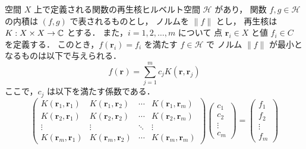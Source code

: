 \begin{theorem}\label{theorem:interp_kernel_rkhs_exact-interp}
    空間 $X$ 上で定義される関数の再生核ヒルベルト空間 $\mathcal{H}$ があり，
    関数 $f, g \in \mathcal{H}$ の内積は $(f, g)$ で表されるものとし，
    ノルムを $\|f\|$ とし，
    再生核は $K : X \times X \to \mathbb{C}$ とする．
    また，$i = 1, 2, \ldots, m$ について
    点 $\bm{r}_i \in X$ と値 $f_i \in C$ を定義する．
    このとき，$f(\bm{r}_i) = f_i$ を満たす $f \in \mathcal{H}$ で
    ノルム $\|f\|$ が最小となるものは以下で与えられる．
    \begin{equation}
        f(\bm{r}) = \sum_{j = 1}^{m} c_j K(\bm{r}, \bm{r}_j)
    \end{equation}
    ここで，$c_j$ は以下を満たす係数である．
    \begin{equation}
        \begin{pmatrix}
            K(\bm{r}_1, \bm{r}_1) & K(\bm{r}_1, \bm{r}_2) & \cdots & K(\bm{r}_1, \bm{r}_m) \\
            K(\bm{r}_2, \bm{r}_1) & K(\bm{r}_2, \bm{r}_2) & \cdots & K(\bm{r}_2, \bm{r}_m) \\
            \vdots                & \vdots                & \ddots & \vdots                \\
            K(\bm{r}_m, \bm{r}_1) & K(\bm{r}_m, \bm{r}_2) & \cdots & K(\bm{r}_m, \bm{r}_m)
        \end{pmatrix}
        \begin{pmatrix}
            c_1 \\ c_2 \\ \vdots \\ c_m
        \end{pmatrix}
        =
        \begin{pmatrix}
            f_1 \\ f_2 \\ \vdots \\ f_m
        \end{pmatrix}
        \label{eq:interp_kernel_rkhs_exact-interp-coeff-equation}
    \end{equation}
\end{theorem}
